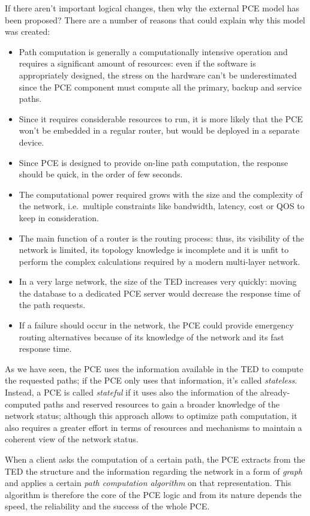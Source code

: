 \documentclass[10pt,a4paper]{report}
\begin{document}
If there aren't important logical changes, then why the external PCE
model has been proposed? There are a number of reasons that could
explain why this model was created:
\begin{itemize}
\item Path computation is generally a computationally intensive
  operation and requires a significant amount of resources: even if
  the software is appropriately designed, the stress on the hardware
  can't be underestimated since the PCE component must compute all the
  primary, backup and service paths.
\item Since it requires considerable resources to run, it is more
  likely that the PCE won't be embedded in a regular router, but would
  be deployed in a separate device.
\item Since PCE is designed to provide on-line path computation, the
  response should be quick, in the order of few seconds.
\item The computational power required grows with the size and the
  complexity of the network, i.e.\ multiple constraints like
  bandwidth, latency, cost or QOS to keep in consideration.
\item The main function of a router is the routing process: thus, its
  visibility of the network is limited, its topology knowledge is
  incomplete and it is unfit to perform the complex calculations
  required by a modern multi-layer network.
\item In a very large network, the size of the TED increases very
  quickly: moving the database to a dedicated PCE server would
  decrease the response time of the path requests.
\item If a failure should occur in the network, the PCE could provide
  emergency routing alternatives because of its knowledge of the
  network and its fast response time.
\end{itemize}

As we have seen, the PCE uses the information available in the TED to
compute the requested paths; if the PCE only uses that information,
it's called \textit{stateless}. Instead, a PCE is called
\textit{stateful} if it uses also the information of the
already-computed paths and reserved resources to gain a broader
knowledge of the network status; although this approach allows to
optimize path computation, it also requires a greater effort in terms
of resources and mechanisms to maintain a coherent view of the network
status.

When a client asks the computation of a certain path, the PCE extracts
from the TED the structure and the information regarding the network
in a form of \textit{graph} and applies a certain \textit{path
  computation algorithm} on that representation. This algorithm is
therefore the core of the PCE logic and from its nature depends the
speed, the reliability and the success of the whole PCE.
\end{document}
